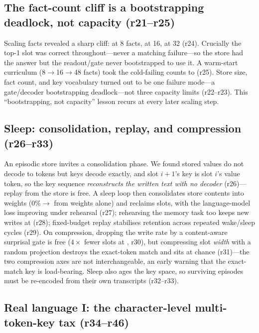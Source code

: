 \subsection{The fact-count cliff is a bootstrapping deadlock, not capacity (r21--r25)}

Scaling facts revealed a sharp cliff:  at 8 facts,  at 16,
 at 32 (r24). Crucially the top-1 slot was correct throughout---never a
matching failure---so the store had the answer but the readout/gate never bootstrapped
to use it. A warm-start curriculum (8$\to$16$\to$48 facts) took the cold-failing
counts to  (r25). Store size, fact count, and key vocabulary turned out to
be one failure mode---a gate/decoder bootstrapping deadlock---not three capacity
limits (r22--r23). This ``bootstrapping, not capacity'' lesson recurs at every later
scaling step.

\subsection{Sleep: consolidation, replay, and compression (r26--r33)}

An episodic store invites a consolidation phase. We found stored values do not decode
to tokens but keys decode exactly, and slot $i{+}1$'s key is slot $i$'s value token, so
the key sequence \emph{reconstructs the written text with no decoder} (r26)---replay
from the store is free. A sleep loop then consolidates store contents into weights
(0\%$\to$ from weights alone) and reclaims slots, with the language-model
loss improving under rehearsal (r27); rehearsing the memory task too keeps new writes
at  (r28); fixed-budget replay stabilises retention across repeated
wake/sleep cycles (r29). On compression, dropping the write rate by a content-aware
surprisal gate is free ($4\times$ fewer slots at , r30), but compressing
slot \emph{width} with a random projection destroys the exact-token match and sits at
chance (r31)---the two compression axes are not interchangeable, an early warning that
the exact-match key is load-bearing. Sleep also ages the key space, so surviving
episodes must be re-encoded from their own transcripts (r32--r33).

\subsection{Real language I: the character-level multi-token-key tax (r34--r46)}

